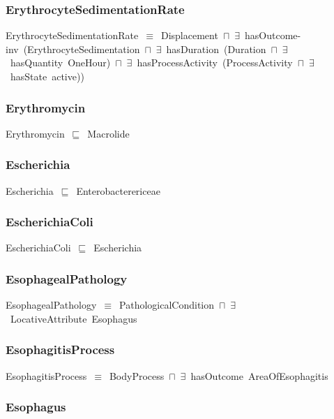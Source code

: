 \documentclass{article}
\begin{document}
\subsubsection*{ErythrocyteSedimentationRate}

ErythrocyteSedimentationRate~\ensuremath{\equiv}~Displacement~\ensuremath{\sqcap}~\ensuremath{\exists}~hasOutcome-inv~(ErythrocyteSedimentation~\ensuremath{\sqcap}~\ensuremath{\exists}~hasDuration~(Duration~\ensuremath{\sqcap}~\ensuremath{\exists}~hasQuantity~OneHour)~\ensuremath{\sqcap}~\ensuremath{\exists}~hasProcessActivity~(ProcessActivity~\ensuremath{\sqcap}~\ensuremath{\exists}~hasState~active))

\subsubsection*{Erythromycin}

Erythromycin~\ensuremath{\sqsubseteq}~Macrolide~

\subsubsection*{Escherichia}

Escherichia~\ensuremath{\sqsubseteq}~Enterobacterericeae~

\subsubsection*{EscherichiaColi}

EscherichiaColi~\ensuremath{\sqsubseteq}~Escherichia~

\subsubsection*{EsophagealPathology}

EsophagealPathology~\ensuremath{\equiv}~PathologicalCondition~\ensuremath{\sqcap}~\ensuremath{\exists}~LocativeAttribute~Esophagus

\subsubsection*{EsophagitisProcess}

EsophagitisProcess~\ensuremath{\equiv}~BodyProcess~\ensuremath{\sqcap}~\ensuremath{\exists}~hasOutcome~AreaOfEsophagitis

\subsubsection*{Esophagus}
\end{document}
